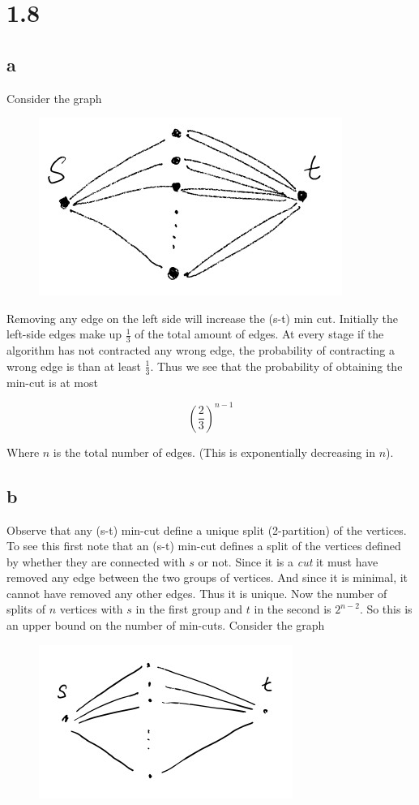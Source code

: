 


\section*{1.8}

\subsection*{a}

Consider the graph

\begin{figure}[h]
	\centering
	\includegraphics[width=0.4\linewidth]{graph1.jpg}

\end{figure}

Removing any edge on the left side will increase the (s-t) min cut. 
Initially the left-side edges make up $\frac{1}{3}$ of the total amount of edges.
At every stage if the algorithm has not contracted any wrong edge, the probability of contracting a wrong edge is than at least $\frac{1}{3}$. Thus we see that the probability of obtaining the min-cut is at most

$$ \left(\frac{2}{3}\right)^{n-1} $$

Where $n$ is the total number of edges. (This is exponentially decreasing in $n$).

\subsection*{b}

Observe that any (s-t) min-cut define a unique split (2-partition) of the vertices.
To see this first note that an (s-t) min-cut defines a split of the vertices defined by whether they are connected with $s$ or not. 
Since it is a \emph{cut} it must have removed any edge between the two groups of vertices.
And since it is minimal, it cannot have removed any other edges. 
Thus it is unique.
Now the number of splits of $n$ vertices with $s$ in the first group and $t$ in the second is $2^{n-2}$.
So this is an upper bound on the number of min-cuts.
Consider the graph

\begin{figure}[h]
	\centering
	\includegraphics[width=0.4\linewidth]{graph2.jpg}
\end{figure}

